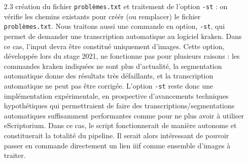\documentclass[a4paper,12pt,twoside]{book}
\begin{document}
\begin{itemize}
\item [2.3] création du fichier \texttt{problèmes.txt} et traitement de l'option \texttt{-st} : on vérifie les chemins existants pour créér (ou remplacer) le fichier \texttt{problèmes.txt}. Nous traitons aussi une commande en option, \texttt{-st}, qui permet de demander une transcription automatique au logiciel kraken. Dans ce cas, l'input devra être constitué uniquement d'images. Cette option, développée lors du stage 2021, ne fonctionne pas pour plusieurs raisons : les commandes kraken indiquées ne sont plus d'actualité, la segmentation automatique donne des résultats très défaillants, et la transcription automatique ne peut pas être corrigée. L'option \texttt{-st} reste donc une implémentation expérimentale, en prospective d'avancements techniques hypothétiques qui permettraient de faire des transcriptions/segmentations automatiques suffisamment performantes comme pour ne plus avoir à utiliser eScriptorium. Dans ce cas, le script fonctionnerait de manière autonome et constituerait la totalité du pipeline. Il serait alors intéressant de pouvoir passer en commande directement un lien iiif comme ensemble d'images à traiter.\\


\end{itemize}
\end{document}
